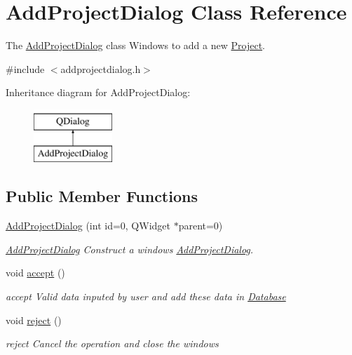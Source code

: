 \hypertarget{classAddProjectDialog}{\section{Add\+Project\+Dialog Class Reference}
\label{classAddProjectDialog}
}


The \hyperlink{classAddProjectDialog}{Add\+Project\+Dialog} class Windows to add a new \hyperlink{classProject}{Project}.  




{\ttfamily \#include $<$addprojectdialog.\+h$>$}

Inheritance diagram for Add\+Project\+Dialog\+:\begin{figure}[H]
\begin{center}
\leavevmode
\includegraphics[height=2.000000cm]{d0/d23/classAddProjectDialog}
\end{center}
\end{figure}
\subsection*{Public Member Functions}
\begin{DoxyCompactItemize}
\item 
\hyperlink{classAddProjectDialog_abb96542ad074344f634d0ff834e65f03}{Add\+Project\+Dialog} (int id=0, Q\+Widget $\ast$parent=0)
\begin{DoxyCompactList}\small\item\em \hyperlink{classAddProjectDialog}{Add\+Project\+Dialog} Construct a windows \hyperlink{classAddProjectDialog}{Add\+Project\+Dialog}. \end{DoxyCompactList}\item 
\hypertarget{classAddProjectDialog_adb873176b67a671fc417e7ab21389c21}{void \hyperlink{classAddProjectDialog_adb873176b67a671fc417e7ab21389c21}{accept} ()}\label{classAddProjectDialog_adb873176b67a671fc417e7ab21389c21}

\begin{DoxyCompactList}\small\item\em accept Valid data inputed by user and add these data in \hyperlink{classDatabase}{Database} \end{DoxyCompactList}\item 
\hypertarget{classAddProjectDialog_a3e6011001312acd234f2352f1a796f0e}{void \hyperlink{classAddProjectDialog_a3e6011001312acd234f2352f1a796f0e}{reject} ()}\label{classAddProjectDialog_a3e6011001312acd234f2352f1a796f0e}

\begin{DoxyCompactList}\small\item\em reject Cancel the operation and close the windows \end{DoxyCompactList}\end{DoxyCompactItemize}


